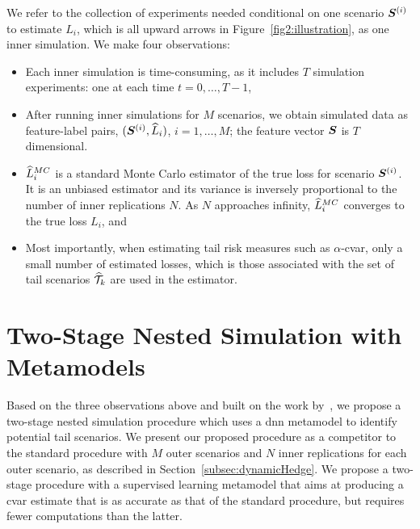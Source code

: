 We refer to the collection of experiments needed conditional on one scenario $\bm{S}^{(i)}$ to estimate $L_i$, which is all upward arrows in Figure~\ref{fig2:illustration}, as one inner simulation.
We make four observations:
\begin{itemize}
    \item   Each inner simulation is time-consuming, as it includes $T$ simulation experiments: one at each time $t=0,\ldots,T-1$,
    \item   After running inner simulations for $M$ scenarios, we obtain simulated data as feature-label pairs, $(\bm{S}^{(i)}, \widehat{L}_i)$, $i=1,\ldots,M$; the feature vector $\bm{S}$ is $T$ dimensional.
    \item   $\widehat{L}_i^{MC}$ is a standard Monte Carlo estimator of the true loss for scenario $\bm{S}^{(i)}$. 
    It is an unbiased estimator and its variance is inversely proportional to the number of inner replications $N$. 
    As $N$ approaches infinity, $\widehat{L}_i^{MC}$ converges to the true loss $L_i$, and
    \item   Most importantly, when estimating tail risk measures such as $\alpha$-\gls{cvar}, only a small number of estimated losses, which is those associated with the set of tail scenarios $\widehat{\mathcal{T}}_{k}$ are used in the estimator.
\end{itemize}

\section{Two-Stage Nested Simulation with Metamodels} \label{sec2:metamodel2Stage}

Based on the three observations above and built on the work by~\cite{dang2020efficient}, we propose a two-stage nested simulation procedure which uses a \gls{dnn} metamodel to identify potential tail scenarios.
We present our proposed procedure as a competitor to the standard procedure with $M$ outer scenarios and $N$ inner replications for each outer scenario, as described in Section~\ref{subsec:dynamicHedge}.
We propose a two-stage procedure with a supervised learning metamodel that aims at producing a \gls{cvar} estimate that is as accurate as that of the standard procedure, but requires fewer computations than the latter.

